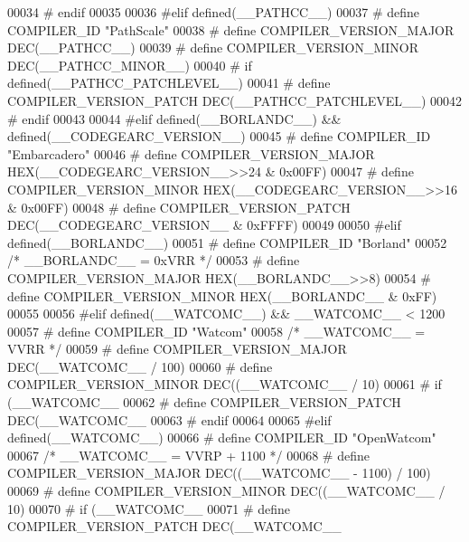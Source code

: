 \begin{DoxyCode}
{{{00034 \textcolor{preprocessor}{# endif}
00035 
00036 \textcolor{preprocessor}{#elif defined(\_\_PATHCC\_\_)}
00037 \textcolor{preprocessor}{# define COMPILER\_ID "PathScale"}
00038 \textcolor{preprocessor}{# define COMPILER\_VERSION\_MAJOR DEC(\_\_PATHCC\_\_)}
00039 \textcolor{preprocessor}{# define COMPILER\_VERSION\_MINOR DEC(\_\_PATHCC\_MINOR\_\_)}
00040 \textcolor{preprocessor}{# if defined(\_\_PATHCC\_PATCHLEVEL\_\_)}
00041 \textcolor{preprocessor}{#  define COMPILER\_VERSION\_PATCH DEC(\_\_PATHCC\_PATCHLEVEL\_\_)}
00042 \textcolor{preprocessor}{# endif}
00043 
00044 \textcolor{preprocessor}{#elif defined(\_\_BORLANDC\_\_) && defined(\_\_CODEGEARC\_VERSION\_\_)}
00045 \textcolor{preprocessor}{# define COMPILER\_ID "Embarcadero"}
00046 \textcolor{preprocessor}{# define COMPILER\_VERSION\_MAJOR HEX(\_\_CODEGEARC\_VERSION\_\_>>24 & 0x00FF)}
00047 \textcolor{preprocessor}{# define COMPILER\_VERSION\_MINOR HEX(\_\_CODEGEARC\_VERSION\_\_>>16 & 0x00FF)}
00048 \textcolor{preprocessor}{# define COMPILER\_VERSION\_PATCH DEC(\_\_CODEGEARC\_VERSION\_\_     & 0xFFFF)}
00049 
00050 \textcolor{preprocessor}{#elif defined(\_\_BORLANDC\_\_)}
00051 \textcolor{preprocessor}{# define COMPILER\_ID "Borland"}
00052   \textcolor{comment}{/* \_\_BORLANDC\_\_ = 0xVRR */}
00053 \textcolor{preprocessor}{# define COMPILER\_VERSION\_MAJOR HEX(\_\_BORLANDC\_\_>>8)}
00054 \textcolor{preprocessor}{# define COMPILER\_VERSION\_MINOR HEX(\_\_BORLANDC\_\_ & 0xFF)}
00055 
00056 \textcolor{preprocessor}{#elif defined(\_\_WATCOMC\_\_) && \_\_WATCOMC\_\_ < 1200}
00057 \textcolor{preprocessor}{# define COMPILER\_ID "Watcom"}
00058    \textcolor{comment}{/* \_\_WATCOMC\_\_ = VVRR */}
00059 \textcolor{preprocessor}{# define COMPILER\_VERSION\_MAJOR DEC(\_\_WATCOMC\_\_ / 100)}
00060 \textcolor{preprocessor}{# define COMPILER\_VERSION\_MINOR DEC((\_\_WATCOMC\_\_ / 10) %
00061 \textcolor{preprocessor}{# if (\_\_WATCOMC\_\_ %
00062 \textcolor{preprocessor}{#  define COMPILER\_VERSION\_PATCH DEC(\_\_WATCOMC\_\_ %
00063 \textcolor{preprocessor}{# endif}
00064 
00065 \textcolor{preprocessor}{#elif defined(\_\_WATCOMC\_\_)}
00066 \textcolor{preprocessor}{# define COMPILER\_ID "OpenWatcom"}
00067    \textcolor{comment}{/* \_\_WATCOMC\_\_ = VVRP + 1100 */}
00068 \textcolor{preprocessor}{# define COMPILER\_VERSION\_MAJOR DEC((\_\_WATCOMC\_\_ - 1100) / 100)}
00069 \textcolor{preprocessor}{# define COMPILER\_VERSION\_MINOR DEC((\_\_WATCOMC\_\_ / 10) %
00070 \textcolor{preprocessor}{# if (\_\_WATCOMC\_\_ %
00071 \textcolor{preprocessor}{#  define COMPILER\_VERSION\_PATCH DEC(\_\_WATCOMC\_\_ %
}}}}}}}}}
\end{DoxyCode}
